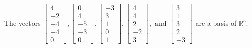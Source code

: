\begin{exercise}
\begin{exerciseStatement}
  \end{exerciseStatement}
  \begin{exerciseAnswer}
   The vectors \(\left[\begin{array}{r}
4 \\
-2 \\
-4 \\
-4 \\
0
\end{array}\right] , \left[\begin{array}{r}
0 \\
4 \\
-5 \\
-3 \\
0
\end{array}\right] , \left[\begin{array}{r}
-3 \\
3 \\
1 \\
0 \\
1
\end{array}\right] , \left[\begin{array}{r}
4 \\
4 \\
2 \\
-2 \\
3
\end{array}\right] , \text{ and } \left[\begin{array}{r}
3 \\
1 \\
3 \\
2 \\
-3
\end{array}\right]\) 
  	 are  a basis of \(\mathbb{R}^5\).
  


  \end{exerciseAnswer}
\end{exercise}